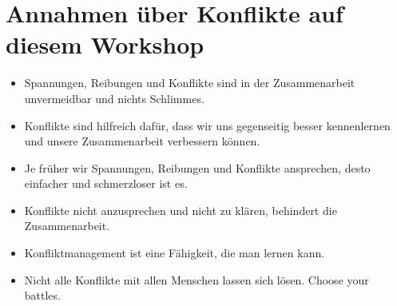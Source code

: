 \section{Annahmen über Konflikte auf diesem Workshop}
\label{konflikte-annahmen}

\begin{itemize}
    \item Spannungen, Reibungen und Konflikte sind in der Zusammenarbeit unvermeidbar und nichts Schlimmes.
    \item Konflikte sind hilfreich dafür, dass wir uns gegenseitig besser kennenlernen und unsere Zusammenarbeit verbessern können.
    \item Je früher wir Spannungen, Reibungen und Konflikte ansprechen, desto einfacher und schmerzloser ist es.
    \item Konflikte nicht anzusprechen und nicht zu klären, behindert die Zusammenarbeit.
    \item Konfliktmanagement ist eine Fähigkeit, die man lernen kann.
    \item Nicht alle Konflikte mit allen Menschen lassen sich lösen. Choose your battles.
\end{itemize}
